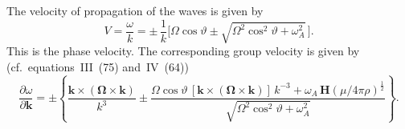 The velocity of propagation of the waves is given by
\begin{equation}
  V = \frac{\omega}{k}
    = \pm\,\frac{1}{k}
    \bigl[\Omega\cos\vartheta
      \pm\sqrt{\Omega^{2}\cos^{2}\!\vartheta+\omega_{A}^{2}}\,\bigr].
  \label{eq:5-19}
\end{equation}
This is the phase velocity.  The corresponding group velocity is given
by (cf.\ equations~III~(75) and~IV~(64))
\begin{equation}
  \frac{\partial\omega}{\partial\mathbf{k}}
  = \pm\left\{
    \frac{\mathbf{k}\times(\boldsymbol{\Omega}\times\mathbf{k})}{k^{3}}
    \pm\frac{\Omega\cos\vartheta\,
      [\mathbf{k}\times(\boldsymbol{\Omega}\times\mathbf{k})]\,k^{-3}
      +\omega_{A}\,\mathbf{H}(\mu/4\pi\rho)^{\frac{1}{2}}}%
    {\sqrt{\Omega^{2}\cos^{2}\!\vartheta+\omega_{A}^{2}}}
  \right\}.
  \label{eq:5-20}
\end{equation}
